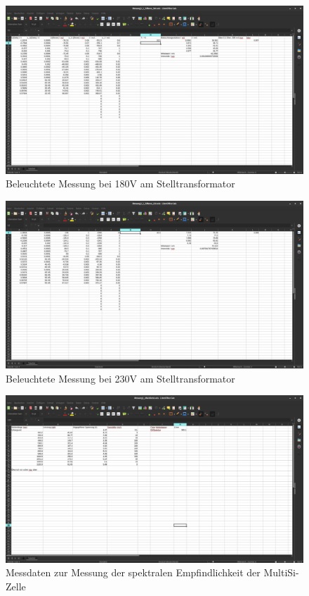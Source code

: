 \begin{figure}[h]
    \captionsetup{justification=centering,margin=2cm}
    \centering
    \includegraphics[angle = 90, width = 12cm]{Bilder/Daten/MessunngMonoSi180.png}
    \caption{Beleuchtete Messung bei 180V am Stelltransformator}
\end{figure}

\begin{figure}[h]
    \captionsetup{justification=centering,margin=2cm}
    \centering
    \includegraphics[angle = 90, width = 12cm]{Bilder/Daten/MessungMonoSi230.png}
    \caption{Beleuchtete Messung bei 230V am Stelltransformator}
\end{figure}






\begin{figure}[h]
    \captionsetup{justification=centering,margin=2cm}
    \centering
    \includegraphics[angle = 90, width = 12cm]{Bilder/Daten/MessunngMultiSi.png}
    \caption{Messdaten zur Messung der spektralen Empfindlichkeit der MultiSi-Zelle}
\end{figure}


